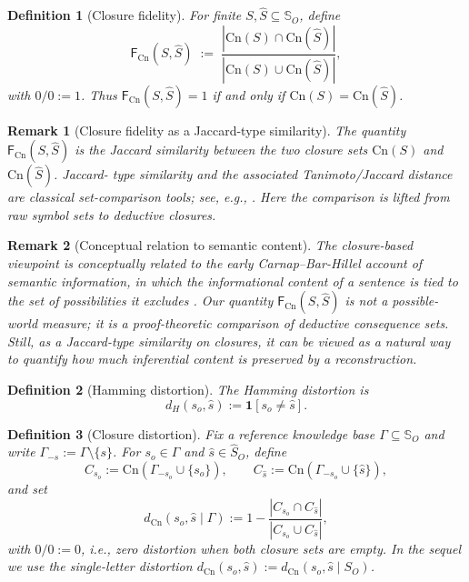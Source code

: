 \documentclass[journal,onecolumn]{IEEEtran}
\newcommand{\Cn}{\text{Cn}}
\newtheorem{definition}{Definition}[section]
\newtheorem{remark}{Remark}[section]
\numberwithin{equation}{section}
\begin{document}
\begin{definition}[Closure fidelity]
\label{def:closure-fidelity}
For finite \(S,\hat S\subseteq\mathbb{S}_O\), define
\[
  \mathsf{F}_{\Cn}(S,\hat S)
  \;:=\;
  \frac{|\Cn(S)\cap\Cn(\hat S)|}
       {|\Cn(S)\cup\Cn(\hat S)|},
\]
with \(0/0:=1\).
Thus \(\mathsf{F}_{\Cn}(S,\hat S)=1\) if and only if
\(\Cn(S)=\Cn(\hat S)\).
\end{definition}

\begin{remark}[Closure fidelity as a Jaccard-type similarity]
\label{rem:closure-jaccard}
The quantity \(\mathsf{F}_{\Cn}(S,\hat S)\) is the Jaccard similarity
between the two closure sets \(\Cn(S)\) and \(\Cn(\hat S)\). Jaccard-
type similarity and the associated Tanimoto/Jaccard distance are
classical set-comparison tools; see, e.g.,
\cite{broder1997resemblance,lipkus1999proof}. Here the comparison is
lifted from raw symbol sets to deductive closures.
\end{remark}

\begin{remark}[Conceptual relation to semantic content]
\label{rem:carnap-bar-hillel}
The closure-based viewpoint is conceptually related to the early
Carnap--Bar-Hillel account of semantic information, in which the
informational content of a sentence is tied to the set of possibilities
it excludes \cite{carnap1952outline}. Our quantity
\(\mathsf{F}_{\Cn}(S,\hat S)\) is not a possible-world measure; it is
a proof-theoretic comparison of deductive consequence sets. Still, as
a Jaccard-type similarity on closures, it can be viewed as a natural
way to quantify how much inferential content is preserved by a
reconstruction.
\end{remark}

\begin{definition}[Hamming distortion]
\label{def:hamming-distortion}
The Hamming distortion \cite[Ch.~10]{cover2006elements} is
\[
  d_H(s_o,\hat s):=\mathbf{1}[s_o\neq \hat s].
\]
\end{definition}

\begin{definition}[Closure distortion]
\label{def:closure-distortion}
Fix a reference knowledge base \(\Gamma\subseteq\mathbb{S}_O\)
and write \(\Gamma_{-s}:=\Gamma\setminus\{s\}\).
For \(s_o\in\Gamma\) and \(\hat s\in\hat S_O\), define
\[
  C_{s_o}:=\Cn(\Gamma_{-s_o}\cup\{s_o\}),
  \qquad
  C_{\hat s}:=\Cn(\Gamma_{-s_o}\cup\{\hat s\}),
\]
and set
\begin{equation}\label{eq:d-Cn}
  d_{\Cn}(s_o,\hat s\mid\Gamma)
  :=
  1-\frac{|C_{s_o}\cap C_{\hat s}|}
          {|C_{s_o}\cup C_{\hat s}|},
\end{equation}
with \(0/0:=0\), i.e., zero distortion when both closure sets are empty.
In the sequel we use the single-letter distortion
\(d_{\Cn}(s_o,\hat s):=d_{\Cn}(s_o,\hat s\mid S_O)\).
\end{definition}
\end{document}
